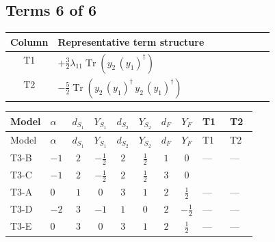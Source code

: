 \documentclass[8pt]{article}
\begin{document}
\begin{landscape}
\subsection*{Terms 6 of 6}
\begin{center}
\begin{tabular}{@{}c >{\raggedright\arraybackslash}p{0.82\linewidth}@{}}
\toprule
Column & Representative term structure \\
\midrule
T1 & \(\displaystyle +\frac{3}{2} {\lambda_{11}} \operatorname{Tr}\!\left({y_2}\,\left({y_1}\right)^{\dagger}\right)\) \\
\midrule
T2 & \(\displaystyle -\frac{5}{2} \operatorname{Tr}\!\left({y_2}\,\left({y_1}\right)^{\dagger}\,{y_2}\,\left({y_1}\right)^{\dagger}\right)\) \\
\midrule
\bottomrule
\end{tabular}
\end{center}
\smallskip
\tiny
\begin{longtable}{@{}llcccccc >{\raggedright\arraybackslash}p{0.21\linewidth} >{\raggedright\arraybackslash}p{0.21\linewidth}@{}}
\toprule
Model & $\alpha$ & $d_{S_1}$ & $Y_{S_1}$ & $d_{S_2}$ & $Y_{S_2}$ & $d_F$ & $Y_F$ & T1 & T2 \\
\midrule
\endfirsthead
\toprule
Model & $\alpha$ & $d_{S_1}$ & $Y_{S_1}$ & $d_{S_2}$ & $Y_{S_2}$ & $d_F$ & $Y_F$ & T1 & T2 \\
\midrule
\endhead
T3-B & $-1$ & $2$ & $-\frac{1}{2}$ & $2$ & $\frac{1}{2}$ & $1$ & $0$ & --- & --- \\
\midrule
T3-C & $-1$ & $2$ & $-\frac{1}{2}$ & $2$ & $\frac{1}{2}$ & $3$ & $0$ & \scriptsize\adjustbox{max width=\linewidth}{$\begin{gathered} +\frac{3}{2} {\lambda_{11}} \operatorname{Tr}\!\left({y_2}\,\left({y_1}\right)^{\dagger}\right)\end{gathered}$} & \scriptsize\adjustbox{max width=\linewidth}{$\begin{gathered} -\frac{5}{2} \operatorname{Tr}\!\left({y_2}\,\left({y_1}\right)^{\dagger}\,{y_2}\,\left({y_1}\right)^{\dagger}\right)\end{gathered}$} \\
\midrule
T3-A & $0$ & $1$ & $0$ & $3$ & $1$ & $2$ & $\frac{1}{2}$ & --- & --- \\
\midrule
T3-D & $-2$ & $3$ & $-1$ & $1$ & $0$ & $2$ & $-\frac{1}{2}$ & --- & --- \\
\midrule
T3-E & $0$ & $3$ & $0$ & $3$ & $1$ & $2$ & $\frac{1}{2}$ & --- & --- \\
\midrule
\bottomrule
\end{longtable}
\clearpage

\end{landscape}
\end{document}

